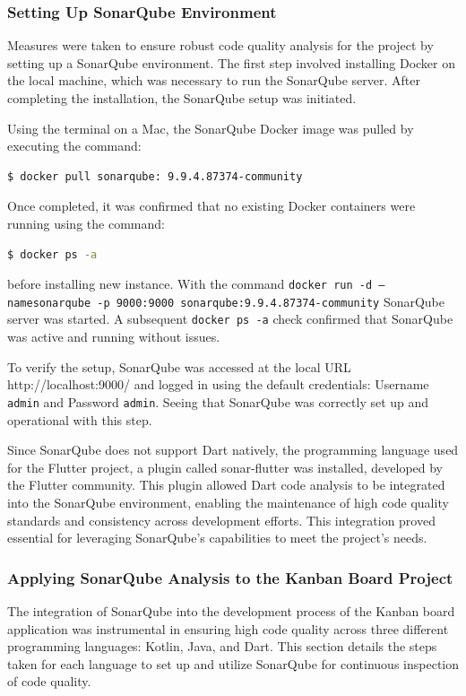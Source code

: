 \subsubsection{Setting Up SonarQube Environment}
Measures were taken to ensure robust code quality analysis for the project by setting up a SonarQube environment. The first step involved installing Docker on the local machine, which was necessary to run the SonarQube server. After completing the installation, the SonarQube setup was initiated.
\par
Using the terminal on a Mac, the SonarQube Docker \cite{Docker} image was pulled by executing the command:
\begin{lstlisting}[language=bash]
    $ docker pull sonarqube: 9.9.4.87374-community 
  \end{lstlisting}
  Once completed, it was confirmed that no existing Docker containers were running using the command:
\begin{lstlisting}[language=bash]
    $ docker ps -a 
\end{lstlisting}
before installing new instance. With the command \texttt{docker run -d — name\newline sonarqube -p 9000:9000 sonarqube:9.9.4.87374-community} SonarQube server was started. A subsequent \texttt{docker ps -a} check confirmed that SonarQube was active and running without issues.
\par
To verify the setup, SonarQube was accessed at the local URL http://localhost:9000/ and logged in using the default credentials: Username \texttt{admin} and Password \texttt{admin}. Seeing that SonarQube was correctly set up and operational with this step.
\par
Since SonarQube does not support Dart natively, the programming language used for the Flutter project, a plugin called sonar-flutter \cite{flutter_sonar} was installed, developed by the Flutter community. This plugin allowed Dart code analysis to be integrated into the SonarQube environment, enabling the maintenance of high code quality standards and consistency across development efforts. This integration proved essential for leveraging SonarQube's capabilities to meet the project's needs.
\subsubsection{Applying SonarQube Analysis to the Kanban Board Project}
The integration of SonarQube into the development process of the Kanban board application was instrumental in ensuring high code quality across three different programming languages: Kotlin, Java, and Dart. This section details the steps taken for each language to set up and utilize SonarQube for continuous inspection of code quality.

